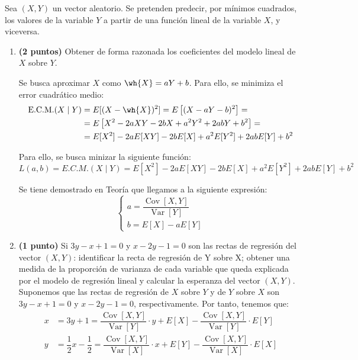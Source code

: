 \documentclass[12pt]{article}
\DeclareMathOperator{\Var}{Var}
\DeclareMathOperator{\Cov}{Cov}
\begin{document}
    \begin{ejercicio}[3 puntos]
        Sea $(X,Y)$ un vector aleatorio. Se pretenden predecir, por mínimos cuadrados, los valores de la variable $Y$ a partir de una función lineal de la variable $X$, y viceversa.
        \begin{enumerate}
            \item \textbf{(2 puntos)} Obtener de forma razonada los coeficientes del modelo lineal de $X$ sobre $Y$.
            
            Se busca aproximar $X$ como $\wh{X}=aY+b$. Para ello, se minimiza el error cuadrático medio:
            \begin{align*}
                \text{E.C.M.}(X\mid Y) &= E[(X-\wh{X})^2]
                = E\left[(X-aY-b)^2\right]
                =\\&= E\left[X^2-2aXY-2bX+a^2Y^2+2abY+b^2\right]
                =\\&= E[X^2]-2aE[XY]-2bE[X]+a^2E[Y^2]+2abE[Y]+b^2
            \end{align*}

            Para ello, se busca minizar la siguiente función:
            \begin{equation*}
                L(a,b) = E.C.M.(X\mid Y) = E[X^2]-2aE[XY]-2bE[X]+a^2E[Y^2]+2abE[Y]+b^2
            \end{equation*}

            Se tiene demostrado en Teoría que llegamos a la siguiente expresión:
            \begin{equation*}
                \begin{cases}
                    a = \dfrac{\Cov[X,Y]}{\Var[Y]} \\
                    b = E[X]-aE[Y]
                \end{cases}
            \end{equation*}
            \item \textbf{(1 punto)} Si $3y-x+1=0$ y $x-2y-1=0$ son las rectas de regresión del vector $(X,Y)$: identificar la recta de regresión de Y sobre X; obtener una medida de la proporción de varianza de cada variable que queda explicada por el modelo de regresión lineal y calcular la esperanza del vector $(X,Y)$.\\
            
            Suponemos que las rectas de regresión de $X$ sobre $Y$ y de $Y$ sobre $X$ son $3y-x+1=0$ y $x-2y-1=0$, respectivamente. Por tanto, tenemos que:
            \begin{align*}
                x &= 3y+1 = \dfrac{\Cov[X,Y]}{\Var[Y]}\cdot y + E[X]-\dfrac{\Cov[X,Y]}{\Var[Y]}\cdot E[Y] \\
                y &= \dfrac{1}{2}x-\dfrac{1}{2} = \dfrac{\Cov[X,Y]}{\Var[X]}\cdot x + E[Y]-\dfrac{\Cov[X,Y]}{\Var[X]}\cdot E[X]
            \end{align*}


\end{enumerate}
\end{ejercicio}
\end{document}
